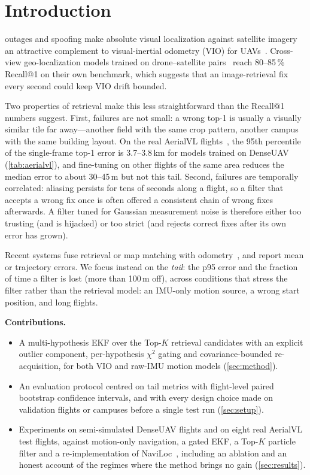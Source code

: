 \documentclass[journal]{IEEEtran}
\begin{document}
\section{Introduction}
 outages and spoofing make absolute visual localization against satellite imagery an attractive
complement to visual-inertial odometry (VIO) for UAVs~\cite{qin2018vins,mourikis2007msckf}. Cross-view geo-localization
models trained on drone--satellite pairs~\cite{zheng2020university,wang2022lpn,dai2022fsra,dai2024denseuav} reach
80--85\,\% Recall@1 on their own benchmark, which suggests that an image-retrieval fix every second could keep VIO drift
bounded.

Two properties of retrieval make this less straightforward than the Recall@1 numbers suggest. First, failures are not
small: a wrong top-1 is usually a visually similar tile far away---another field with the same crop pattern, another
campus with the same building layout. On the real AerialVL flights~\cite{he2024aerialvl}, the 95th percentile of the
single-frame top-1 error is 3.7--3.8\,km for models trained on DenseUAV (\cref{tab:aerialvl}), and fine-tuning on other
flights of the same area reduces the median error to about 30--45\,m but not this tail. Second, failures are
temporally correlated: aliasing persists for tens of seconds along a flight, so a filter that accepts a wrong fix once
is often offered a consistent chain of wrong fixes afterwards. A filter tuned for Gaussian measurement noise is
therefore either too trusting (and is hijacked) or too strict (and rejects correct fixes after its own error has grown).

Recent systems fuse retrieval or map matching with odometry~\cite{he2023foundloc,shpagin2026naviloc,li2025geovins,swapf2025},
and report mean or trajectory errors. We focus instead on the \emph{tail}: the p95 error and the fraction of time a
filter is lost (more than 100\,m off), across conditions that stress the filter rather than the retrieval model: an
IMU-only motion source, a wrong start position, and long flights.

\textbf{Contributions.}
\begin{itemize}
  \item A multi-hypothesis EKF over the Top-$K$ retrieval candidates with an explicit outlier component, per-hypothesis
  $\chi^2$ gating and covariance-bounded re-acquisition, for both VIO and raw-IMU motion models (\cref{sec:method}).
  \item An evaluation protocol centred on tail metrics with flight-level paired bootstrap confidence intervals, and with
  every design choice made on validation flights or campuses before a single test run (\cref{sec:setup}).
  \item Experiments on semi-simulated DenseUAV flights and on eight real AerialVL test flights, against motion-only
  navigation, a gated EKF, a Top-$K$ particle filter and a re-implementation of NaviLoc~\cite{shpagin2026naviloc},
  including an ablation and an honest account of the regimes where the method brings no gain (\cref{sec:results}).
\end{itemize}
\end{document}

